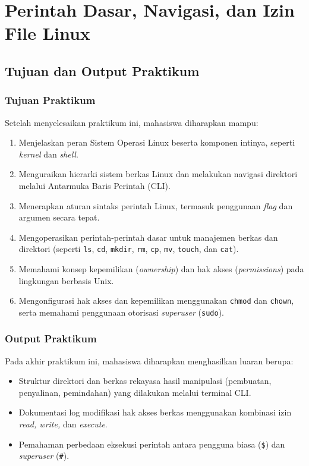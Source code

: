 
\chapter{Perintah Dasar, Navigasi, dan Izin File Linux}
\label{chap:modul-03}

\section{Tujuan dan Output Praktikum}

\subsection{Tujuan Praktikum}
Setelah menyelesaikan praktikum ini, mahasiswa diharapkan mampu:
\begin{enumerate}
	\item Menjelaskan peran Sistem Operasi Linux beserta komponen intinya, seperti \textit{kernel} dan \textit{shell}.
	\item Menguraikan hierarki sistem berkas Linux dan melakukan navigasi direktori melalui Antarmuka Baris Perintah (CLI).
	\item Menerapkan aturan sintaks perintah Linux, termasuk penggunaan \textit{flag} dan argumen secara tepat.
	\item Mengoperasikan perintah-perintah dasar untuk manajemen berkas dan direktori (seperti \texttt{ls}, \texttt{cd}, \texttt{mkdir}, \texttt{rm}, \texttt{cp}, \texttt{mv}, \texttt{touch}, dan \texttt{cat}).
	\item Memahami konsep kepemilikan (\textit{ownership}) dan hak akses (\textit{permissions}) pada lingkungan berbasis Unix.
	\item Mengonfigurasi hak akses dan kepemilikan menggunakan \texttt{chmod} dan \texttt{chown}, serta memahami penggunaan otorisasi \textit{superuser} (\texttt{sudo}).
\end{enumerate}

\subsection{Output Praktikum}
Pada akhir praktikum ini, mahasiswa diharapkan menghasilkan luaran berupa:
\begin{itemize}
	\item Struktur direktori dan berkas rekayasa hasil manipulasi (pembuatan, penyalinan, pemindahan) yang dilakukan melalui terminal CLI.
	\item Dokumentasi log modifikasi hak akses berkas menggunakan kombinasi izin \textit{read, write,} dan \textit{execute}.
	\item Pemahaman perbedaan eksekusi perintah antara pengguna biasa (\texttt{\$}) dan \textit{superuser} (\texttt{\#}).
\end{itemize}

